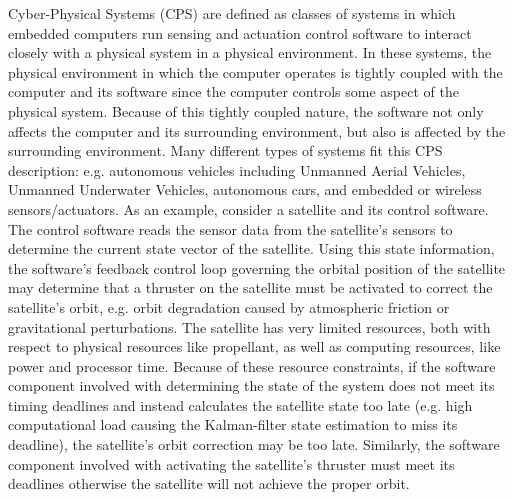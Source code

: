 Cyber-Physical Systems (CPS) are defined as classes of systems in which embedded computers run sensing and actuation control software to interact closely with a physical system in a physical environment.  In these systems, the physical environment in which the computer operates is tightly coupled with the computer and its software since the computer controls some aspect of the physical system.  Because of this tightly coupled nature, the software not only affects the computer and its surrounding environment, but also is affected by the surrounding environment.  Many different types of systems fit this CPS description: e.g. autonomous vehicles including Unmanned Aerial Vehicles, Unmanned Underwater Vehicles, autonomous cars, and embedded or wireless sensors/actuators.  As an example, consider a satellite and its control software.  The control software reads the sensor data from the satellite's sensors to determine the current state vector of the satellite.  Using this state information, the software's feedback control loop governing the orbital position of the satellite may determine that a thruster on the satellite must be activated to correct the satellite's orbit, e.g. orbit degradation caused by atmospheric friction or gravitational perturbations.  The satellite has very limited resources, both with respect to physical resources like propellant, as well as computing resources, like power and processor time.  Because of these resource constraints, if the software component involved with determining the state of the system does not meet its timing deadlines and instead calculates the satellite state too late (e.g. high computational load causing the Kalman-filter state estimation to miss its deadline), the satellite's orbit correction may be too late.  Similarly, the software component involved with activating the satellite's thruster must meet its deadlines otherwise the satellite will not achieve the proper orbit. 

